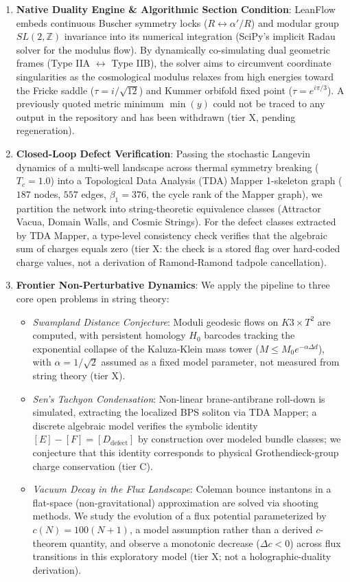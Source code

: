 \documentclass[11pt]{letter}
\providecommand{\numreconcile}[2]{#1}
\begin{document}
\begin{enumerate}
    \item \textbf{Native Duality Engine \& Algorithmic Section Condition}: LeanFlow embeds continuous Buscher symmetry locks ($R \leftrightarrow \alpha'/R$) and modular group $SL(2, \mathbb{Z})$ invariance into its numerical integration (SciPy's implicit Radau solver for the modulus flow). By dynamically co-simulating dual geometric frames (Type IIA $\leftrightarrow$ Type IIB), the solver aims to circumvent coordinate singularities as the cosmological modulus relaxes from high energies toward the Fricke saddle ($\tau = i/\sqrt{12}$) and Kummer orbifold fixed point ($\tau = e^{i\pi/3}$). A previously quoted metric minimum $\min(y)$ could not be traced to any output in the repository and has been withdrawn (tier X, pending regeneration).

    \item \textbf{Closed-Loop Defect Verification}: Passing the stochastic Langevin dynamics of a multi-well landscape across thermal symmetry breaking ($T_c = 1.0$) into a Topological Data Analysis (TDA) Mapper 1-skeleton graph ($\numreconcile{187}{\text{nodes}}$ nodes, $\numreconcile{557}{\text{edges}}$ edges, $\beta_1 = \numreconcile{376}{\beta_1}$, the cycle rank of the Mapper graph), we partition the network into string-theoretic equivalence classes (Attractor Vacua, Domain Walls, and Cosmic Strings). For the defect classes extracted by TDA Mapper, a type-level consistency check verifies that the algebraic sum of charges equals zero (tier X: the check is a stored flag over hard-coded charge values, not a derivation of Ramond-Ramond tadpole cancellation).

    \item \textbf{Frontier Non-Perturbative Dynamics}: We apply the pipeline to three core open problems in string theory:
    \begin{itemize}
        \item \emph{Swampland Distance Conjecture}: Moduli geodesic flows on $K3 \times T^2$ are computed, with persistent homology $H_0$ barcodes tracking the exponential collapse of the Kaluza-Klein mass tower ($M \le M_0 e^{-\alpha \Delta d}$), with $\alpha = 1/\sqrt{2}$ assumed as a fixed model parameter, not measured from string theory (tier X).
        \item \emph{Sen's Tachyon Condensation}: Non-linear brane-antibrane roll-down is simulated, extracting the localized BPS soliton via TDA Mapper; a discrete algebraic model verifies the symbolic identity $[E] - [F] = [D_{\text{defect}}]$ by construction over modeled bundle classes; we conjecture that this identity corresponds to physical Grothendieck-group charge conservation (tier C).
        \item \emph{Vacuum Decay in the Flux Landscape}: Coleman bounce instantons in a flat-space (non-gravitational) approximation are solved via shooting methods. We study the evolution of a flux potential parameterized by $c(N) = 100(N+1)$, a model assumption rather than a derived $c$-theorem quantity, and observe a monotonic decrease ($\Delta c < 0$) across flux transitions in this exploratory model (tier X; not a holographic-duality derivation).
    \end{itemize}


\end{enumerate}
\end{document}
